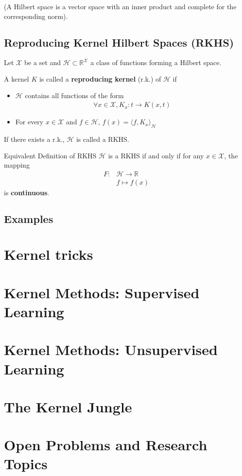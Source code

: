 \documentclass{article}
\begin{document}
(A Hilbert space is a vector space with an inner product and complete for the 
corresponding norm).

\subsection{Reproducing Kernel Hilbert Spaces (RKHS)}

Let $\mathcal{X}$ be a set and $\mathcal{H} \subset \mathbb{R}^\mathcal{X}$ a 
class of functions forming a Hilbert space. 
\begin{Definition}{}{}
    A kernel $K$ is called a \textbf{reproducing kernel} (r.k.) of $\mathcal{H}$ 
    if 
    \begin{itemize}
        \item $\mathcal{H}$ contains all functions of the form 
        \begin{align*}
           \boxed{\forall x \in \mathcal{X}, K_x: t \rightarrow K(x, t)}
        \end{align*}
        \item For every $x \in \mathcal{X}$ and $f\in \mathcal{H}$, 
        $\boxed{f(x) = \langle f, K_x \rangle_\mathcal{H} }$
    \end{itemize}
\end{Definition}

If there exists a r.k., $\mathcal{H}$ is called a RKHS.

\begin{Definition}{Equivalent Definition of RKHS}{}
    $\mathcal{H}$ is a RKHS if and only if for any $x\in\mathcal{X}$, the 
    mapping
    \begin{align*}
        F: & \mathcal{H}\rightarrow \mathbb{R}\\
        & f \mapsto f(x)
    \end{align*}
    is \textbf{continuous}.
\end{Definition}

\subsection{Examples}

\section{Kernel tricks}

\section{Kernel Methods: Supervised Learning}

\section{Kernel Methods: Unsupervised Learning}

\section{The Kernel Jungle}

\section{Open Problems and Research Topics}
\end{document}
